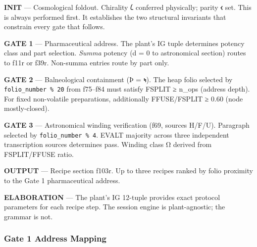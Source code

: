 \textbf{INIT} --- Cosmological foldout. Chirality 𐑖 conferred
physically; parity 𐑬 set. This is always performed first. It establishes
the two structural invariants that constrain every gate that follows.

\textbf{GATE 1} --- Pharmaceutical address. The plant's IG tuple
determines potency class and part selection. \emph{Summa} potency (d = 0
to astronomical section) routes to f11r or f39r. Non-summa entries route
by part only.

\textbf{GATE 2} --- Balneological containment (Þ = 𐑰). The heap folio
selected by \texttt{folio\_number\ \%\ 20} from f75--f84 must satisfy
FSPLIT ≥ n\_ops (address depth). For fixed non-volatile preparations,
additionally FFUSE/FSPLIT ≥ 0.60 (node mostly-closed).

\textbf{GATE 3} --- Astronomical winding verification (f69, sources
H/F/U). Paragraph selected by \texttt{folio\_number\ \%\ 4}. EVALT
majority across three independent transcription sources determines pass.
Winding class Ω derived from FSPLIT/FFUSE ratio.

\textbf{OUTPUT} --- Recipe section f103r. Up to three recipes ranked by
folio proximity to the Gate 1 pharmaceutical address.

\textbf{ELABORATION} --- The plant's IG 12-tuple provides exact protocol
parameters for each recipe step. The session engine is plant-agnostic;
the grammar is not.

\hypertarget{gate-1-address-mapping}{%
\subsubsection{Gate 1 Address Mapping}\label{gate-1-address-mapping}}

